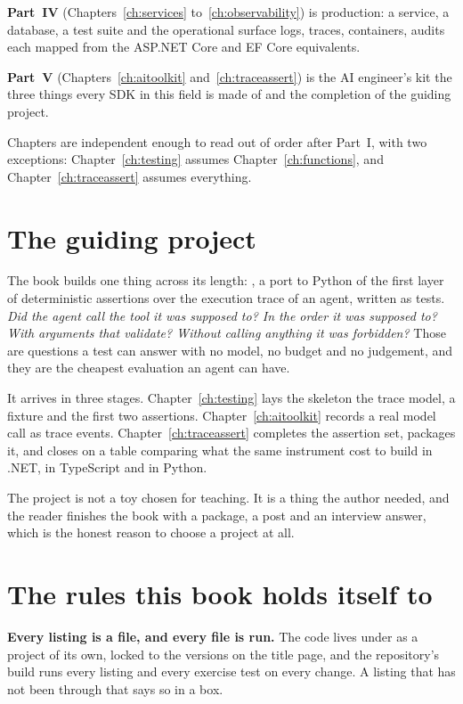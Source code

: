 \textbf{Part~IV \dash{} \lblPartIV} (Chapters~\ref{ch:services}
to~\ref{ch:observability}) is production: a service, a database, a test suite
and the operational surface \dash{} logs, traces, containers, audits \dash{}
each mapped from the ASP.NET Core and EF Core equivalents.

\textbf{Part~V \dash{} \lblPartV} (Chapters~\ref{ch:aitoolkit}
and~\ref{ch:traceassert}) is the AI engineer's kit \dash{} the three things
every SDK in this field is made of \dash{} and the completion of the guiding
project.

Chapters are independent enough to read out of order after Part~I, with two
exceptions: Chapter~\ref{ch:testing} assumes Chapter~\ref{ch:functions}, and
Chapter~\ref{ch:traceassert} assumes everything.

\section*{The guiding project}

The book builds one thing across its length: \textbf{}, a
port to Python of the first layer of  \dash{}
deterministic assertions over the execution trace of an agent, written as
 tests. \emph{Did the agent call the tool it was supposed to? In
the order it was supposed to? With arguments that validate? Without calling
anything it was forbidden?} Those are questions a test can answer with no
model, no budget and no judgement, and they are the cheapest evaluation an
agent can have.

It arrives in three stages. Chapter~\ref{ch:testing} lays the skeleton \dash{}
the trace model, a fixture and the first two assertions. Chapter~\ref{ch:aitoolkit}
records a real model call as trace events. Chapter~\ref{ch:traceassert}
completes the assertion set, packages it, and closes on a table comparing what
the same instrument cost to build in .NET, in TypeScript and in Python.

The project is not a toy chosen for teaching. It is a thing the author needed,
and the reader finishes the book with a package, a post and an interview
answer, which is the honest reason to choose a project at all.

\section*{The rules this book holds itself to}

\begin{note}
\textbf{Every listing is a file, and every file is run.} The code lives under
 as a project of its own, locked to the versions on the title
page, and the repository's build runs every listing and every exercise test on
every change. A listing that has not been through that says so in a box.
\end{note}

